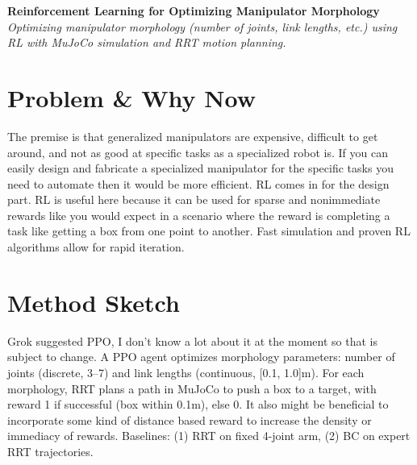 \documentclass[10pt]{article}
\begin{document}
\begin{center}
    \textbf{\large Reinforcement Learning for Optimizing Manipulator Morphology} \\
    \vspace{2pt}
    \textit{Optimizing manipulator morphology (number of joints, link lengths, etc.) using RL with MuJoCo simulation and RRT motion planning.}
\end{center}

\vspace{-5pt}
\section*{Problem \& Why Now}
The premise is that generalized manipulators are expensive, difficult to get around, and not as good at specific tasks as a specialized robot is.
If you can easily design and fabricate a specialized manipulator for the specific tasks you need to automate then it would be more efficient.
RL comes in for the design part.
RL is useful here because it can be used for sparse and nonimmediate rewards like you would expect in a scenario where the reward is completing a task like getting a box from one point to another.
Fast simulation and proven RL algorithms allow for rapid iteration.

\vspace{-5pt}
\section*{Method Sketch}
Grok suggested PPO, I don't know a lot about it at the moment so that is subject to change. 
A PPO agent optimizes morphology parameters: number of joints (discrete, 3--7) and link lengths (continuous, [0.1, 1.0]m). 
For each morphology, RRT plans a path in MuJoCo to push a box to a target, with reward 1 if successful (box within 0.1m), else 0. 
It also might be beneficial to incorporate some kind of distance based reward to increase the density or immediacy of rewards. 
Baselines: (1) RRT on fixed 4-joint arm, (2) BC on expert RRT trajectories.
\end{document}

